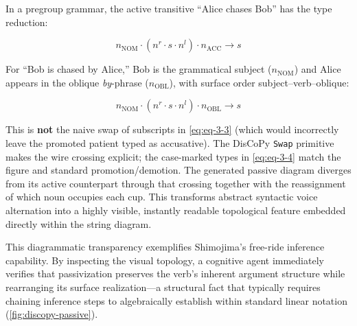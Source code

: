 \documentclass[
]{article}
\begin{document}
In a pregroup grammar, the active transitive ``Alice chases Bob'' has
the type reduction:

\begin{equation}
n_{\text{NOM}} \cdot (n^r \cdot s \cdot n^l) \cdot n_{\text{ACC}} \to s
\label{eq:eq-3-3}
\end{equation}

For ``Bob is chased by Alice,'' Bob is the grammatical subject
(\(n_{\text{NOM}}\)) and Alice appears in the oblique \emph{by}-phrase
(\(n_{\text{OBL}}\)), with surface order subject--verb--oblique:

\begin{equation}
n_{\text{NOM}} \cdot (n^r \cdot s \cdot n^l) \cdot n_{\text{OBL}} \to s
\label{eq:eq-3-4}
\end{equation}

This is \textbf{not} the naive swap of subscripts in \eqref{eq:eq-3-3}
(which would incorrectly leave the promoted patient typed as
accusative). The DisCoPy \texttt{Swap} primitive makes the wire crossing
explicit; the case-marked types in \eqref{eq:eq-3-4} match the figure
and standard promotion/demotion. The generated passive diagram diverges
from its active counterpart through that crossing together with the
reassignment of which noun occupies each cup. This transforms abstract
syntactic voice alternation into a highly visible, instantly readable
topological feature embedded directly within the string diagram.

This diagrammatic transparency exemplifies Shimojima's
\citeyearpar{shimojima1996reasoning} free-ride inference capability. By
inspecting the visual topology, a cognitive agent immediately verifies
that passivization preserves the verb's inherent argument structure
while rearranging its surface realization---a structural fact that
typically requires chaining inference steps to algebraically establish
within standard linear notation (\autoref{fig:discopy-passive}).
\end{document}
